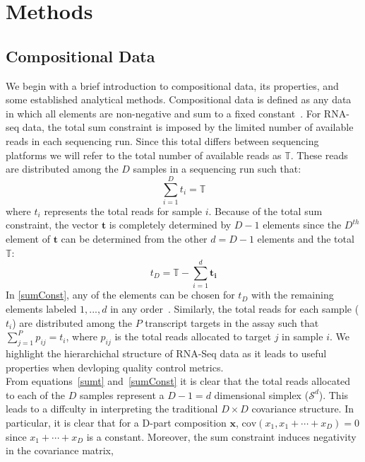 \documentclass{article}\usepackage[]{graphicx}\usepackage[]{color}
\theoremstyle{definition}
\begin{document}
\section{Methods}

\subsection{Compositional Data}
We begin with a brief introduction to compositional data, its properties, and some established analytical methods.  Compositional data is defined as any data in which all elements are non-negative and sum to a fixed constant~\cite{Aitchison1986}. %
For RNA-seq data, the total sum constraint is imposed by the limited number of available reads in each sequencing run.  Since this total differs between sequencing platforms we will refer to the total number of available reads as $\mathbb{T}$. These reads are distributed among the $D$ samples in a sequencing run such that:
\begin{equation}
\sum_{i=1}^{D} t_i = \mathbb{T}
\label{sumt}
\end{equation}
where $t_i$ represents the total reads for sample $i$.  Because of the total sum constraint, the vector $\mathbf{t}$ is completely determined by $D-1$ elements since the $D^{th}$ element of $\mathbf{t}$ can be determined from the other $d = D-1$ elements and the total $\mathbb{T}$:  
\begin{equation}
t_D = \mathbb{T} - \sum_{i=1}^{d} \mathbf{t_i}
\label{sumConst}
\end{equation}
In \ref{sumConst}, any of the elements can be chosen for $t_D$ with the remaining elements labeled $1, ..., d$ in any order~\cite{Aitchison1986}.  Similarly, the total reads for each sample ($t_i$) are distributed among the $P$ transcript targets in the assay such that $\sum_{j=1}^{P} p_{ij} = t_i$, where $p_{ij}$ is the total reads allocated to target $j$ in sample $i$.  We highlight the hierarchichal structure of RNA-Seq data as it leads to useful properties when devloping quality control metrics.\\


From equations~\ref{sumt} and~\ref{sumConst} it is clear that the total reads allocated to each of the $D$ samples represent a $D - 1 = d$ dimensional simplex ($\mathcal{S}^d$). This leads to a diffculty in interpreting the traditional $D \times D$ covariance structure.  In particular, it is clear that for a D-part composition $\mathbf{x}$, $\text{cov}(x_1, x_1+ \cdots +x_D) = 0$  since $x_1 + \cdots + x_D$ is a constant.  Moreover, the sum constraint induces negativity in the covariance matrix,
\end{document}
